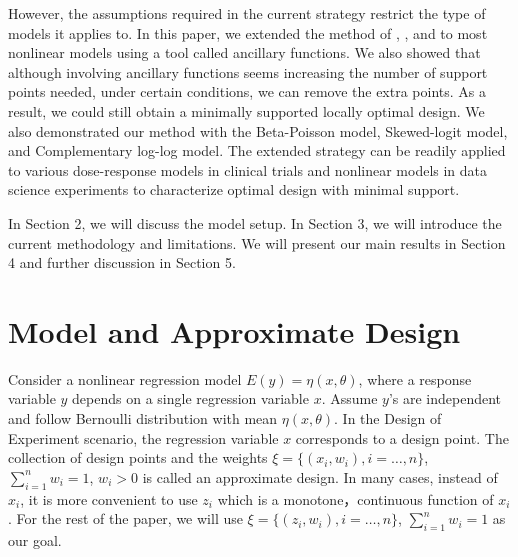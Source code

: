 \documentclass[11pt]{amsart}
\theoremstyle{definition}
\theoremstyle{remark}
\numberwithin{equation}{section}
\begin{document}
 


 However, the assumptions required in the current strategy restrict the type of models it applies to. In this paper, we extended the method of \cite{yang2009}, \cite{yang2010}, and \cite{yang2012} to most nonlinear models using a tool called ancillary functions. We also showed that although involving ancillary functions seems increasing the number of support points needed, under certain conditions, we can remove the extra points. As a result, we could still obtain a minimally supported locally optimal design. We also demonstrated our method with the Beta-Poisson model, Skewed-logit model, and Complementary log-log model. The extended strategy can be readily applied to various dose-response models in clinical trials and nonlinear models in data science experiments to characterize optimal design with minimal support. 


In Section 2, we will discuss the model setup. In Section 3, we will introduce the current methodology and limitations. We will present our main results in Section 4 and further discussion in Section 5. 



\section{Model and Approximate Design}
Consider a nonlinear regression model $ E(y) = \eta(x,\theta)$, where a response variable $y$ depends on a single regression variable $x$. Assume $y$'s are independent and follow Bernoulli distribution with mean  $\eta(x,\theta)$. In the Design of Experiment scenario, the regression variable $x$ corresponds to a design point. The collection of design points and the weights $\xi = \{(x_i,w_i), i=\ldots,n\}$, $\sum_{i=1}^nw_i = 1$, $w_i> 0$ is called an approximate design. In many cases,  instead of $x_i$, it is more convenient to use $z_i$ which is a monotone，continuous function of $x_i$. For the rest of the paper, we will use $\xi = \{(z_i,w_i), i=\ldots,n\}$, $\sum_{i=1}^nw_i = 1$ as our goal. 
\end{document}
